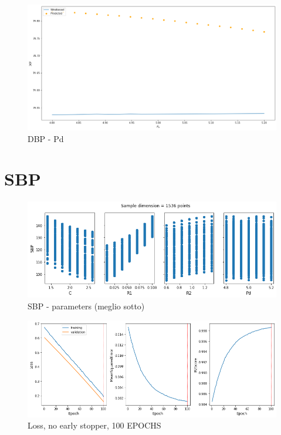\newpage


\begin{figure}[h]
    \centering
    \includegraphics[width=1\textwidth]{images/Training - temp/DBP - Pd.png}
    \caption{DBP - Pd}
\end{figure}






\newpage
\section{SBP}
\begin{figure}[h]
    \centering
    \includegraphics[width=1\textwidth]{images/Training - temp/SBP - parameters.png}
    \caption{SBP - parameters (meglio sotto)}
\end{figure}

\newpage

\begin{figure}[h]
    \centering
    \includegraphics[width=1\textwidth]{images/Training - temp/SBP - loss.png}
    \caption{Loss, no early stopper, 100 EPOCHS}
\end{figure}


